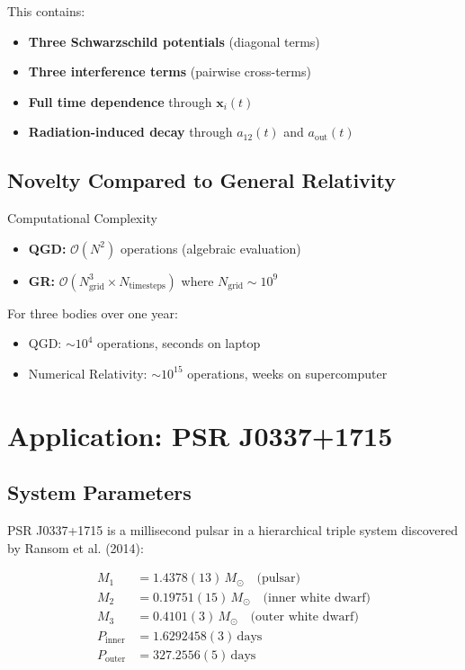 \documentclass[11pt,a4paper]{article}
\theoremstyle{definition}
\theoremstyle{remark}
\begin{document}
	This contains:
	\begin{itemize}
		\item \textbf{Three Schwarzschild potentials} (diagonal terms)
		\item \textbf{Three interference terms} (pairwise cross-terms)
		\item \textbf{Full time dependence} through $\mathbf{x}_i(t)$
		\item \textbf{Radiation-induced decay} through $a_{12}(t)$ and $a_{\text{out}}(t)$
	\end{itemize}
	
	\subsection{Novelty Compared to General Relativity}
	
	Computational Complexity\label{prop:complexity}
		\begin{itemize}
			\item \textbf{QGD:} $\mathcal{O}(N^2)$ operations (algebraic evaluation)
			\item \textbf{GR:} $\mathcal{O}(N_{\text{grid}}^3 \times N_{\text{timesteps}})$ where $N_{\text{grid}} \sim 10^9$
		\end{itemize}
		
		For three bodies over one year:
		\begin{itemize}
			\item QGD: $\sim 10^4$ operations, seconds on laptop
			\item Numerical Relativity: $\sim 10^{15}$ operations, weeks on supercomputer
		\end{itemize}
	
	\section{Application: PSR J0337+1715}
	
	\subsection{System Parameters}
	
	PSR J0337+1715 is a millisecond pulsar in a hierarchical triple system discovered by Ransom et al. (2014):
	
	\begin{align}
		M_1 &= 1.4378(13)\, M_\odot \quad \text{(pulsar)} \label{eq:M1_obs}\\
		M_2 &= 0.19751(15)\, M_\odot \quad \text{(inner white dwarf)} \label{eq:M2_obs}\\
		M_3 &= 0.4101(3)\, M_\odot \quad \text{(outer white dwarf)} \label{eq:M3_obs}\\
		P_{\text{inner}} &= 1.6292458(3)\, \text{days} \label{eq:P_inner_obs}\\
		P_{\text{outer}} &= 327.2556(5)\, \text{days} \label{eq:P_outer_obs}
	\end{align}
	
\end{document}

